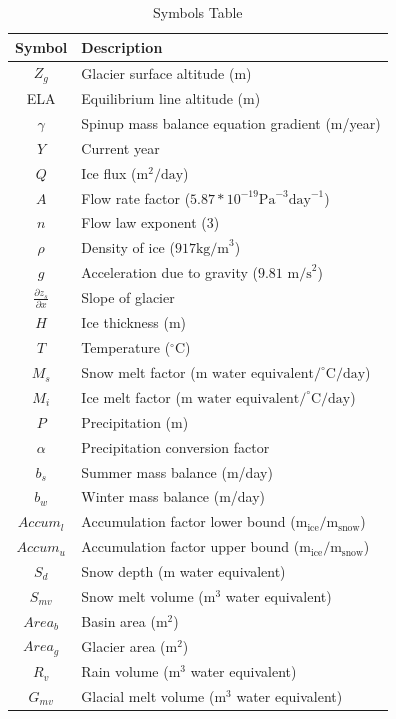 \documentclass{article}
\begin{document}
\begin{table}[h!]
    \centering
    \begin{tabularx}{\textwidth}{|c|X|}
        \hline
        Symbol & Description \\
        \hline
        $Z_g$ & Glacier surface altitude (m) \\
        ELA & Equilibrium line altitude (m)\\
        $\gamma$ & Spinup mass balance equation gradient (m/year)\\
        $Y$ & Current year \\
        $Q$ & Ice flux ($\text{m}^2/\text{day}$)\\
        $A$ & Flow rate factor ($5.87*10^{-19}\text{Pa}^{-3}\text{day}^{-1}$) \\
        $n$ & Flow law exponent (3) \\
        $\rho$ & Density of ice ($917\text{kg/m}^3$) \\
        $g$ & Acceleration due to gravity ($9.81\text{ m/s}^2$) \\
        $\frac{\partial z_s}{\partial x}$ & Slope of glacier \\
        $H$ & Ice thickness (m)\\
        $T$ & Temperature ($^\circ$C) \\
        $M_{s}$ & Snow melt factor ($\text{m water equivalent}/^\circ\text{C}/\text{day}$) \\
        $M_{i}$ & Ice melt factor ($\text{m water equivalent}/^\circ\text{C}/\text{day}$) \\
        $P$ & Precipitation (m) \\
        $\alpha$ & Precipitation conversion factor \\
        $b_s$ & Summer mass balance (m/day) \\
        $b_w$ & Winter mass balance (m/day) \\
        ${Accum}_{l}$ & Accumulation factor lower bound ($\text{m}_{\text{ice}}/\text{m}_{\text{snow}}$) \\
        ${Accum}_{u}$ & Accumulation factor upper bound ($\text{m}_{\text{ice}}/\text{m}_{\text{snow}}$) \\
        $S_{d}$ & Snow depth (m water equivalent) \\
        $S_{mv}$ & Snow melt volume ($\text{m}^3$ water equivalent) \\
        ${Area}_{b}$ & Basin area ($\text{m}^2$) \\
        ${Area}_{g} $ & Glacier area ($\text{m}^2$) \\
        $R_{v}$ & Rain volume ($\text{m}^3$ water equivalent) \\
        $G_{mv}$ & Glacial melt volume ($\text{m}^3$ water equivalent) \\
        \hline
    \end{tabularx}
    \caption{Symbols Table}
    \label{tab:symbols_table}
\end{table}
\FloatBarrier
\end{document}
